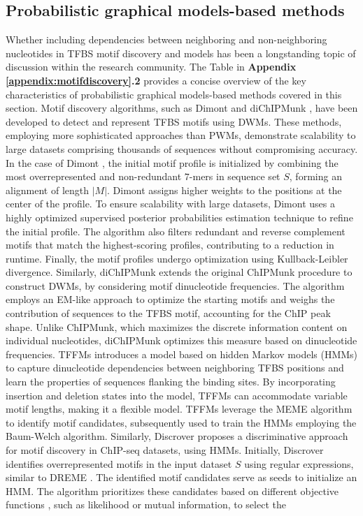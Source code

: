 \documentclass[a4paper, titlepage, openright]{book}
\begin{document}
\subsection{Probabilistic graphical models-based methods}\label{subsection:probabilistic-methods-appendix}
Whether including dependencies between neighboring and non-neighboring nucleotides in TFBS motif discovery and models has been a longstanding topic of discussion within the research community. The Table in \textbf{Appendix \ref{appendix:motifdiscovery}.2} provides a concise overview of the key characteristics of probabilistic graphical models-based methods covered in this section. Motif discovery algorithms, such as Dimont \citep{grau2013general} and diChIPMunk \citep{kulakovskiy2013binding}, have been developed to detect and represent TFBS motifs using DWMs. These methods, employing more sophisticated approaches than PWMs, demonstrate scalability to large datasets comprising thousands of sequences without compromising accuracy. In the case of Dimont \citep{grau2013general}, the initial motif profile is initialized by combining the most overrepresented and non-redundant $7$-mers in sequence set $S$, forming an alignment of length $|M|$. Dimont assigns higher weights to the positions at the center of the profile. To ensure scalability with large datasets, Dimont uses a highly optimized supervised posterior probabilities estimation technique to refine the initial profile. The algorithm also filters redundant and reverse complement motifs that match the highest-scoring profiles, contributing to a reduction in runtime. Finally, the motif profiles undergo optimization using Kullback-Leibler divergence. Similarly, diChIPMunk \citep{kulakovskiy2013binding} extends the original ChIPMunk \citep{kulakovskiy2010deep} procedure to construct DWMs, by considering motif dinucleotide frequencies. The algorithm employs an EM-like approach to optimize the starting motifs and weighs the contribution of sequences to the TFBS motif, accounting for the ChIP peak shape. Unlike ChIPMunk, which maximizes the discrete information content on individual nucleotides, diChIPMunk optimizes this measure based on dinucleotide frequencies. TFFMs \citep{mathelier2013next} introduces a model based on hidden Markov models (HMMs) to capture dinucleotide dependencies between neighboring TFBS positions and learn the properties of sequences flanking the binding sites. By incorporating insertion and deletion states into the model, TFFMs can accommodate variable motif lengths, making it a flexible model. TFFMs leverage the MEME algorithm \citep{bailey1994fitting,bailey1995value,bailey2006meme} to identify motif candidates, subsequently used to train the HMMs employing the Baum-Welch algorithm. Similarly, Discrover \citep{maaskola2014binding} proposes a discriminative approach for motif discovery in ChIP-seq datasets, using HMMs. Initially, Discrover identifies overrepresented motifs in the input dataset $S$ using regular expressions, similar to DREME \citep{bailey2011dreme}. The identified motif candidates serve as seeds to initialize an HMM. The algorithm prioritizes these candidates based on different objective functions \citep{maaskola2014binding}, such as likelihood or mutual information, to select the 
\end{document}
